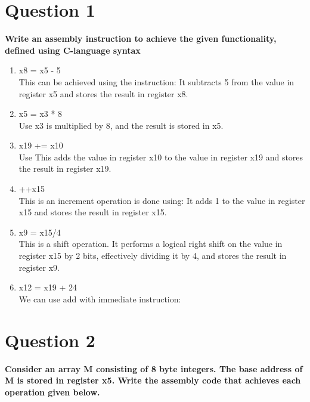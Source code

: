 \section{Question 1} 

\textbf{Write an assembly instruction to achieve the given functionality, defined using C-language syntax}
\begin{enumerate}
    \item x8 = x5 - 5 \\ This can be achieved using the instruction:  It subtracts 5 from the value in register x5 and stores the result in register x8.
    \item x5 = x3 * 8 \\ Use  x3 is multiplied by 8, and the result is stored in x5.
    \item x19 += x10 \\ Use  This adds the value in register x10 to the value in register x19 and stores the result in register x19.
    \item ++x15 \\ This is an increment operation is done using:  It adds 1 to the value in register x15 and stores the result in register x15.
    \item x9 = x15/4 \\ This is a shift operation.  It performs a logical right shift on the value in register x15 by 2 bits, effectively dividing it by 4, and stores the result in register x9.
    \item x12 = x19 + 24 \\ We can use add with immediate instruction:  
\end{enumerate}

\section{Question 2}
\textbf{Consider an array M consisting of 8 byte integers. The base address of M is stored in register x5. Write the assembly code that achieves each operation given below.}

